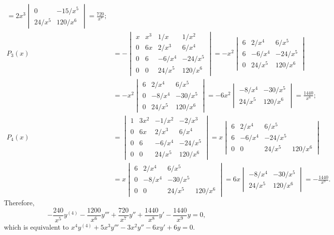 \documentclass[openany]{book}
\newenvironment{sectionSolutions}{
 \begin{enumerate}[item-label={\thesection.\arabic{enumi}.}]
}{
 \end{enumerate}
}
\begin{document}
\begin{sectionSolutions}
\begin{alist}
\begin{align*}
=2x^3\begin{vmatrix}
0&-15/x^5\\
24/x^5&120/x^6
\end{vmatrix}=\frac{720}{ x^7};\\
P_3(x)&=
-\begin{vmatrix}
x&x^3&1/x&1/x^2\\
0&6x&2/x^3&6/x^4\\
0&6&-6/x^4&-24/x^5\\0&0&24/x^5&120/x^6
\end{vmatrix}=
-x^2\begin{vmatrix}
6&2/x^4&6/x^5\\
6&-6/x^4&-24/x^5\\
0&24/x^5&120/x^6
\end{vmatrix}\\
&=-x^2\begin{vmatrix}
6&2/x^4&6/x^5\\
0&-8/x^4&-30/x^5\\
0&24/x^5&120/x^6
\end{vmatrix}
=-6x^2\begin{vmatrix}
-8/x^4&-30/x^5\\
24/x^5&120/x^6
\end{vmatrix}=\frac{1440}{ x^6};\\
P_4(x)&=
\begin{vmatrix}
1&3x^2&-1/x^2&-2/x^3\\
0&6x&2/x^3&6/x^4\\
0&6&-6/x^4&-24/x^5\\0&0&24/x^5&120/x^6
\end{vmatrix}=
x\begin{vmatrix}
6&2/x^4&6/x^5\\
6&-6/x^4&-24/x^5\\
0&0&24/x^5&120/x^6
\end{vmatrix}\\
&=x\begin{vmatrix}
6&2/x^4&6/x^5\\
0&-8/x^4&-30/x^5\\
0&0&24/x^5&120/x^6
\end{vmatrix}
=6x\begin{vmatrix}
-8/x^4&-30/x^5\\
24/x^5&120/x^6
\end{vmatrix}=-\frac{1440}{ x^9}.
\end{align*}
Therefore,
\[
-\frac{240}{ x^5}y^{(4)}-\frac{1200}{ x^6}y'''+\frac{720}{
x^7}y''+\frac{1440}{ x^8}y'-\frac{1440}{ x^9}y=0,
\]
which is equivalent to
$x^4y^{(4)}+5x^3y'''-3x^2y''-6xy'+6y=0$.


\end{alist}
\end{sectionSolutions}
\end{document}
